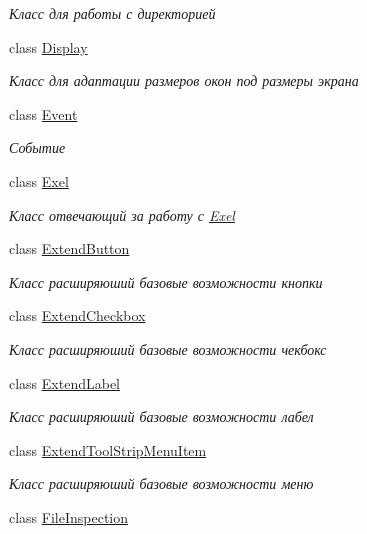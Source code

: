 \begin{DoxyCompactItemize}
\begin{DoxyCompactList}\small\item\em Класс для работы с директорией \end{DoxyCompactList}\item 
class \hyperlink{class_client_1_1_display}{Display}
\begin{DoxyCompactList}\small\item\em Класс для адаптации размеров окон под размеры экрана \end{DoxyCompactList}\item 
class \hyperlink{class_client_1_1_event}{Event}
\begin{DoxyCompactList}\small\item\em Событие \end{DoxyCompactList}\item 
class \hyperlink{class_client_1_1_exel}{Exel}
\begin{DoxyCompactList}\small\item\em Класс отвечающий за работу с \hyperlink{class_client_1_1_exel}{Exel} \end{DoxyCompactList}\item 
class \hyperlink{class_client_1_1_extend_button}{Extend\+Button}
\begin{DoxyCompactList}\small\item\em Класс расширяюший базовые возможности кнопки \end{DoxyCompactList}\item 
class \hyperlink{class_client_1_1_extend_checkbox}{Extend\+Checkbox}
\begin{DoxyCompactList}\small\item\em Класс расширяюший базовые возможности чекбокс \end{DoxyCompactList}\item 
class \hyperlink{class_client_1_1_extend_label}{Extend\+Label}
\begin{DoxyCompactList}\small\item\em Класс расширяюший базовые возможности лабел \end{DoxyCompactList}\item 
class \hyperlink{class_client_1_1_extend_tool_strip_menu_item}{Extend\+Tool\+Strip\+Menu\+Item}
\begin{DoxyCompactList}\small\item\em Класс расширяюший базовые возможности меню \end{DoxyCompactList}\item 
class \hyperlink{class_client_1_1_file_inspection}{File\+Inspection}

\end{DoxyCompactItemize}
